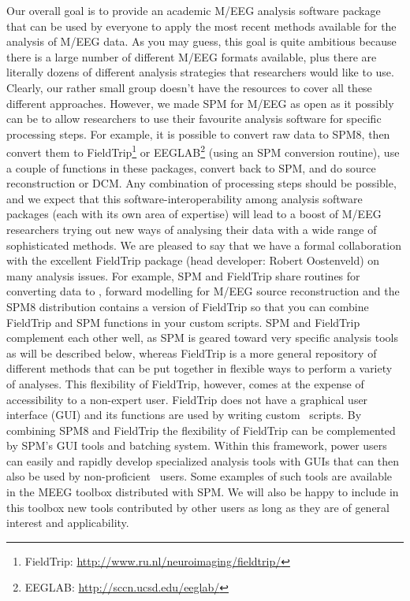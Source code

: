 Our overall goal is to provide an academic M/EEG analysis software package that can be used by everyone to apply the most recent methods available for the analysis of M/EEG data. As you may guess, this goal is quite ambitious because there is a large number of different M/EEG formats available, plus there are literally dozens of different analysis strategies that researchers would like to use. Clearly, our rather small group doesn't have the resources to cover all these different approaches. However, we made SPM for M/EEG as open as it possibly can be to allow researchers to use their favourite analysis software for specific processing steps. For example, it is possible to convert raw data to SPM8, then convert them to FieldTrip\footnote{FieldTrip: \url{http://www.ru.nl/neuroimaging/fieldtrip/}} or EEGLAB\footnote{EEGLAB: \url{http://sccn.ucsd.edu/eeglab/}} (using an SPM conversion routine), use a couple of functions in these packages, convert back to SPM, and do source reconstruction or DCM. Any combination of processing steps should be possible, and we expect that this software-interoperability among analysis software packages (each with its own area of expertise) will lead to a boost of M/EEG researchers trying out new ways of analysing their data with a wide range of sophisticated methods. We are pleased to say that we have a formal collaboration with the excellent FieldTrip package (head developer: Robert Oostenveld) on many analysis issues. For example, SPM and FieldTrip share routines for converting data to \matlab, forward modelling for M/EEG source reconstruction and the SPM8 distribution contains a version of FieldTrip so that you can combine FieldTrip and SPM functions in your custom scripts. SPM and FieldTrip complement each other well, as SPM is geared toward very specific analysis tools as will be described below, whereas FieldTrip is a more general repository of different methods that can be put together in flexible ways to perform a variety of analyses. This flexibility of FieldTrip, however, comes at the expense of accessibility to a non-expert user. FieldTrip does not have a graphical user interface (GUI) and its functions are used by writing custom \matlab\ scripts. By combining SPM8 and FieldTrip the flexibility of FieldTrip can be complemented by SPM's GUI tools and batching system. Within this framework, power users can easily and rapidly develop specialized analysis tools with GUIs that can then  also be used by non-proficient \matlab\ users. Some examples of such tools are available in the MEEG toolbox distributed with SPM. We will also be happy to include in this toolbox new tools contributed by other users as long as they are of general interest and applicability.
